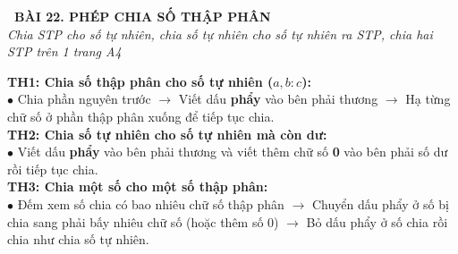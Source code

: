 \documentclass[14pt,a4paper,oneside]{extbook}
\begin{document}
\noindent
\begin{tcolorbox}[
  enhanced,
  colback=teal!8!white,
  colframe=teal!80!black,
  arc=3mm,
  boxrule=1.1pt,
  width=\linewidth,
  halign=center,
  top=2.2mm, bottom=2.2mm,
  left=3mm, right=3mm,
  drop fuzzy shadow
]
  {\large\bfseries\color{teal!95!black}\faBookmark\ BÀI 22. PHÉP CHIA SỐ THẬP PHÂN}\\[2pt]
  {\scriptsize\color{black!75}\itshape Chia STP cho số tự nhiên, chia số tự nhiên cho số tự nhiên ra STP, chia hai STP trên 1 trang A4}
\end{tcolorbox}

\vspace{3.2mm}
\noindent
\begin{tcolorbox}[
  enhanced,
  title={\footnotesize\bfseries\color{white}\faKey\ 1. Ba trường hợp của phép chia số thập phân},
  colback=blue!2!white,
  colframe=blue!75!black,
  arc=2.5mm, boxrule=0.8pt, top=1.8mm, bottom=1.8mm, left=2.5mm, right=2.5mm
]
  \footnotesize
  \textbf{TH1: Chia số thập phân cho số tự nhiên ($a,b : c$):}\\
  $\bullet$ Chia phần nguyên trước $\rightarrow$ Viết dấu \textbf{phẩy} vào bên phải thương $\rightarrow$ Hạ từng chữ số ở phần thập phân xuống để tiếp tục chia.\\
  \textbf{TH2: Chia số tự nhiên cho số tự nhiên mà còn dư:}\\
  $\bullet$ Viết dấu \textbf{phẩy} vào bên phải thương và viết thêm chữ số \textbf{0} vào bên phải số dư rồi tiếp tục chia.\\
  \textbf{TH3: Chia một số cho một số thập phân:}\\
  $\bullet$ Đếm xem số chia có bao nhiêu chữ số thập phân $\rightarrow$ Chuyển dấu phẩy ở số bị chia sang phải bấy nhiêu chữ số (hoặc thêm số $0$) $\rightarrow$ Bỏ dấu phẩy ở số chia rồi chia như chia số tự nhiên.
\end{tcolorbox}

\vspace{3mm}
\end{document}

